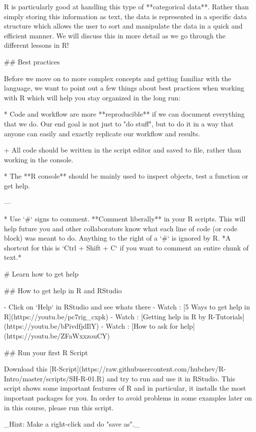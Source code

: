 R is particularly good at handling this type of **categorical data**. Rather than simply storing this information as text, the data is represented in a specific data structure which allows the user to sort and manipulate the data in a quick and efficient manner. We will discuss this in more detail as we go through the different lessons in R!  

## Best practices

Before we move on to more complex concepts and getting familiar with the language, we want to point out a few things about best practices when working with R which will help you stay organized in the long run:

* Code and workflow are more **reproducible** if we can document everything that we do. Our end goal is not just to "do stuff", but to do it in a way that anyone can easily and exactly replicate our workflow and results. 

+ All code should be written in the script editor and saved to file, rather than working in the console.

* The **R console** should be mainly used to inspect objects, test a function or get help. 

---

* Use `#` signs to comment. **Comment liberally** in your R scripts. This will help future you and other collaborators know what each line of code (or code block) was meant to do. Anything to the right of a `#` is ignored by R. *A shortcut for this is `Ctrl + Shift + C` if you want to comment an entire chunk of text.*


# Learn how to get help

## How to get help in R and RStudio

- Click on `Help` in RStudio and see whats there
- Watch : [5 Ways to get help in R](https://youtu.be/pc7rig_cxpk) 
- Watch : [Getting help in R by R-Tutorials](https://youtu.be/bPivdfjdIlY)
- Watch : [How to ask for help](https://youtu.be/ZFaWxxzouCY)

## Run your first R Script

Download this [R-Script](https://raw.githubusercontent.com/hubchev/R-Intro/master/scripts/SH-R-01.R) and try to run and use it in RStudio. This script shows some important features of R and in particular, it installs the most important packages for you. In order to avoid problems in some examples later on in this course, please run this script.

_Hint: Make a right-click and do "save as"._


